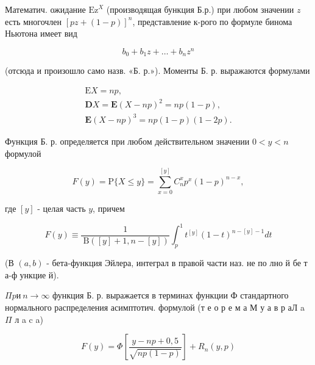 \documentclass[10pt]{article}
\begin{document}
Математич. ожидание $\mathrm{Ez}^{X}$ (производящая бункция Б.р.) при любом значении $z$ есть многочлен $[p z+(1-p)]^{n}$, представление к-рого по формуле бинома Ньютона имеет вид



\[

b_{0}+b_{1} z+\ldots+b_{n} z^{n}

\]



(отсюда и произошло само назв. «Б. р.»). Моменты Б. р. выражаются формулами



\[

\begin{gathered}

\mathrm{E} X=n p, \\

\mathbf{D} X=\mathbf{E}(X-n p)^{2}=n p(1-p), \\

\mathbf{E}(X-n p)^{3}=n p(1-p)(1-2 p) .

\end{gathered}

\]



Функция Б. р. определяется при любом действительном значении $0<y<n$ формулой



\[

F(y)=\mathrm{P}\{X \leqslant y\}=\sum_{x=0}^{[y]} C_{n}^{x} p^{x}(1-p)^{n-x},

\]



где $[y]$ - целая часть $y$, причем



\[

F(y) \equiv \frac{1}{\mathrm{~B}([y]+1, n-[y])} \int_{p}^{1} t^{[y]}(1-t)^{n-[y]-1} d t

\]



(В $(a, b)$ - бета-функция Эйлера, интеграл в правой части наз. не по лно й бе т а-ф ункцие й).



$\Pi p и ~ n \rightarrow \infty$ функция Б. р. выражается в терминах функции Ф стандартного нормального распределения асимптотич. формулой (т е о р е м а М у а в р аЛ a $\Pi$ л a c a)



\[

F(y)=\Phi\left[\frac{y-n p+0,5}{\sqrt{n p(1-p)}}\right]+R_{n}(y, p)

\]
\end{document}
